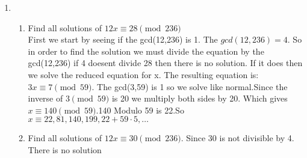 \documentclass[12pt]{article}
\begin{document}
\begin{enumerate}
\begin{enumerate}
            \end{enumerate}
      \item \begin{enumerate}
                  \item Find all solutions of $12x \equiv 28 \pmod{236}$\\
                        First we start by seeing if the gcd(12,236) is 1. The $gcd(12,236) = 4$. So in order to find the solution we must divide the equation by the gcd(12,236) if 4 doesent divide 28 then there is no solution. If it does then we solve the reduced equation for x. The resulting equation is:$3x \equiv 7 \pmod{59}$. The gcd(3,59) is 1 so we solve like normal.Since the inverse of $3\pmod{59}$ is 20 we multiply both sides by 20. Which gives $x\equiv 140 \pmod{59}$.140 Modulo 59 is 22.So $x \equiv 22,81,140,199,22+59\cdot 5, \dots$
                  \item Find all solutions of $12x \equiv 30 \pmod{236}$. Since 30  is not divisible by 4. There is no solution
            \end{enumerate}


\end{enumerate}
\end{document}
